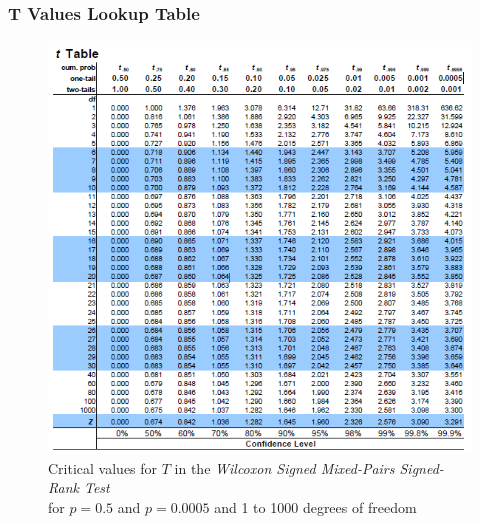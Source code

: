 \subsubsection{T Values Lookup Table} 
\begin{figure}[hbt]
\includegraphics{t-vales.png}
\caption{Critical values for $T$ in the \emph{Wilcoxon Signed Mixed-Pairs Signed-Rank Test} \\ for $p = 0.5$ and $p=0.0005$ and 1 to 1000 degrees of freedom}
\end{figure}
